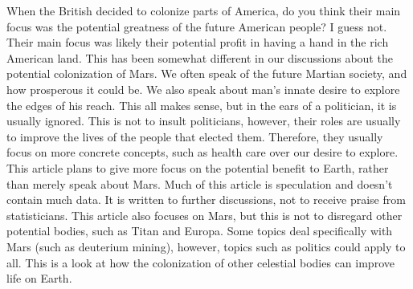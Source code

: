 \documentclass[main.tex]{subfiles}
\begin{document}
When the British decided to colonize parts of America, do you think their main focus was the potential greatness of the future American people? I guess not. Their main focus was likely their potential profit in having a hand in the rich American land. This has been somewhat different in our discussions about the potential colonization of Mars. We often speak of the future Martian society, and how prosperous it could be. We also speak about man's innate desire to explore the edges of his reach. This all makes sense, but in the ears of a politician, it is usually ignored. This is not to insult politicians, however, their roles are usually to improve the lives of the people that elected them. Therefore, they usually focus on more concrete concepts, such as health care over our desire to explore. This article plans to give more focus on the potential benefit to Earth, rather than merely speak about Mars. Much of this article is speculation and doesn't contain much data. It is written to further discussions, not to receive praise from statisticians. This article also focuses on Mars, but this is not to disregard other potential bodies, such as Titan and Europa. Some topics deal specifically with Mars (such as deuterium mining), however, topics such as politics could apply to all. This is a look at how the colonization of other celestial bodies can improve life on Earth.
\end{document}
